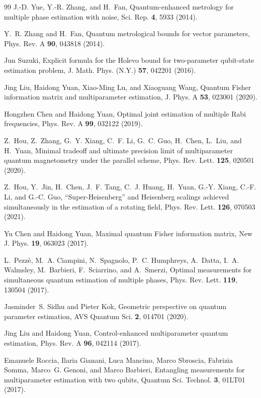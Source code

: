 \documentclass[
aps,
prl,
twocolumn,

superscriptaddress]{revtex4-2}
\begin{document}
\begin{thebibliography}{99}
J.-D. Yue, Y.-R. Zhang, and H.~Fan, Quantum-enhanced metrology for multiple
phase estimation with noise, Sci. Rep. \textbf{4}, 5933 (2014).

Y.~R. Zhang and H.~Fan, Quantum metrological bounds for vector parameters,
Phys. Rev. A \textbf{90}, 043818 (2014).

Jun Suzuki, Explicit formula for the Holevo bound for two-parameter qubit-state
estimation problem, J. Math. Phys. (N.Y.) \textbf{57}, 042201 (2016).

Jing Liu, Haidong Yuan, Xiao-Ming Lu, and Xiaoguang Wang, Quantum Fisher
information matrix and multiparameter estimation, J. Phys. A \textbf{53},
023001 (2020).

Hongzhen Chen and Haidong Yuan, Optimal joint estimation of multiple Rabi
frequencies, Phys. Rev. A \textbf{99}, 032122 (2019).

Z.~Hou, Z.~Zhang, G.~Y. Xiang, C.~F. Li, G.~C. Guo, H.~Chen, L.~Liu, and
H.~Yuan, Minimal tradeoff and ultimate precision limit of multiparameter
quantum magnetometry under the parallel scheme, Phys. Rev. Lett. \textbf{125},
020501 (2020).

Z.~Hou, Y.~Jin, H.~Chen, J.~F. Tang, C.~J. Huang, H.~Yuan, G.-Y. Xiang,
C.-F. Li, and G.-C. Guo, ``Super-Heisenberg'' and Heisenberg scalings achieved
simultaneously in the estimation of a rotating field, Phys. Rev. Lett.
\textbf{126}, 070503 (2021).

Yu Chen and Haidong Yuan, Maximal quantum Fisher information matrix, New J.
Phys. \textbf{19}, 063023 (2017).

L.~Pezz{\`e}, M.~A. Ciampini, N.~Spagnolo, P.~C. Humphreys, A.~Datta,
I.~A. Walmsley, M.~Barbieri, F.~Sciarrino, and A.~Smerzi, Optimal measurements
for simultaneous quantum estimation of multiple phases, Phys. Rev. Lett.
\textbf{119}, 130504 (2017).

Jasminder~S. Sidhu and Pieter Kok, Geometric perspective on quantum parameter
estimation, AVS Quantum Sci. \textbf{2}, 014701 (2020).

Jing Liu and Haidong Yuan, Control-enhanced multiparameter quantum estimation,
Phys. Rev. A \textbf{96}, 042114 (2017).

Emanuele Roccia, Ilaria Gianani, Luca Mancino, Marco Sbroscia, Fabrizia Somma,
Marco~G. Genoni, and Marco Barbieri, Entangling measurements for multiparameter
estimation with two qubits, Quantum Sci. Technol. \textbf{3}, 01LT01 (2017).


\end{thebibliography}
\end{document}
